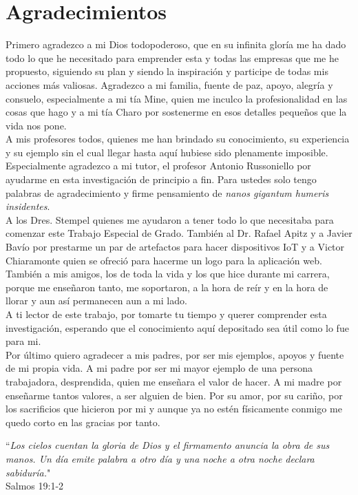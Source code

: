\chapter*{Agradecimientos}
Primero agradezco a mi Dios todopoderoso, que en su infinita gloría me ha dado todo lo que he necesitado para emprender esta y todas las empresas que me he propuesto, siguiendo su plan y siendo la inspiración y participe de todas mis acciones más valiosas. Agradezco a mi familia, fuente de paz, apoyo, alegría y consuelo, especialmente a mi tía Mine, quien me inculco la profesionalidad en las cosas que hago y a mi tía Charo por sostenerme en esos detalles pequeños que la vida nos pone.\\

A mis profesores todos, quienes me han brindado su conocimiento, su experiencia y su ejemplo sin el cual llegar hasta aquí hubiese sido plenamente imposible. Especialmente agradezco a mi tutor, el profesor Antonio Russoniello por ayudarme en esta investigación de principio a fin. Para ustedes solo tengo palabras de agradecimiento y firme pensamiento de \textit{nanos gigantum humeris insidentes}.\\ 

A los Dres. Stempel quienes me ayudaron a tener todo lo que necesitaba para comenzar este Trabajo Especial de Grado. También al Dr. Rafael Apitz y a Javier Bavío por prestarme un par de artefactos para hacer dispositivos IoT y a Victor Chiaramonte quien se ofreció para hacerme un logo para la aplicación web. También a mis amigos, los de toda la vida y los que hice durante mi carrera, porque me enseñaron tanto, me soportaron, a la hora de reír y en la hora de llorar y aun así permanecen aun a mi lado.\\

A ti lector de este trabajo, por tomarte tu tiempo y querer comprender esta investigación, esperando que el conocimiento aquí depositado sea útil como lo fue para mi.\\

Por último quiero agradecer a mis padres, por ser mis ejemplos, apoyos y fuente de mi propia vida. A mi padre por ser mi mayor ejemplo de una persona trabajadora, desprendida, quien me enseñara el valor de hacer. A mi madre por enseñarme tantos valores, a ser alguien de bien. Por su amor, por su cariño, por los sacrificios que hicieron por mi y aunque ya no estén físicamente conmigo me quedo corto en las gracias por tanto. 
\vspace{35pt}
\begin{flushright}
``\textit{Los cielos cuentan la gloria de Dios y el firmamento anuncia la obra de sus manos. Un día emite palabra a otro día y una noche a otra noche declara sabiduría.}"\\
Salmos 19:1-2
\end{flushright}





